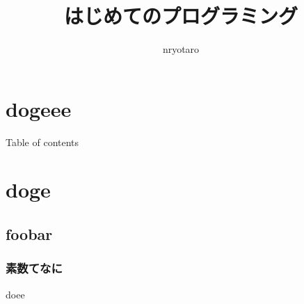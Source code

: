 \documentclass[unicode]{beamer}
\title{はじめてのプログラミング}
\author{nryotaro}
\institute{doge}
\begin{document}
\begin{frame}
\titlepage
\end{frame}
\section{dogeee}
\begin{frame}{Table of contents}
  \tableofcontents[currentsection] %
\end{frame}
\section{doge}
\subsection{foobar}
\begin{frame}
\frametitle{素数てなに}
doee
\end{frame}
\end{document}
